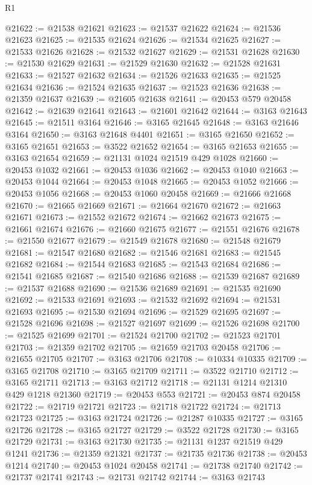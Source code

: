 \begin{lexlean}{R1}
\begin{coremodule}
@21622 := @21538 @21621
@21623 := @21537 @21622
@21624 := @21536 @21623
@21625 := @21535 @21624
@21626 := @21534 @21625
@21627 := @21533 @21626
@21628 := @21532 @21627
@21629 := @21531 @21628
@21630 := @21530 @21629
@21631 := @21529 @21630
@21632 := @21528 @21631
@21633 := @21527 @21632
@21634 := @21526 @21633
@21635 := @21525 @21634
@21636 := @21524 @21635
@21637 := @21523 @21636
@21638 := @21359 @21637
@21639 := @21605 @21638
@21641 := @20453 @579 @20458
@21642 := @21639 @21641
@21643 := @21601 @21642
@21644 := @3163 @21643
@21645 := @21511 @3164
@21646 := @3165 @21645
@21648 := @3163 @21646 @3164
@21650 := @3163 @21648 @4401
@21651 := @3165 @21650
@21652 := @3165 @21651
@21653 := @3522 @21652
@21654 := @3165 @21653
@21655 := @3163 @21654
@21659 := @21131 @1024 @21519 @429 @1028
@21660 := @20453 @1032
@21661 := @20453 @1036
@21662 := @20453 @1040
@21663 := @20453 @1044
@21664 := @20453 @1048
@21665 := @20453 @1052
@21666 := @20453 @1056
@21668 := @20453 @1060 @20458
@21669 := @21666 @21668
@21670 := @21665 @21669
@21671 := @21664 @21670
@21672 := @21663 @21671
@21673 := @21552 @21672
@21674 := @21662 @21673
@21675 := @21661 @21674
@21676 := @21660 @21675
@21677 := @21551 @21676
@21678 := @21550 @21677
@21679 := @21549 @21678
@21680 := @21548 @21679
@21681 := @21547 @21680
@21682 := @21546 @21681
@21683 := @21545 @21682
@21684 := @21544 @21683
@21685 := @21543 @21684
@21686 := @21541 @21685
@21687 := @21540 @21686
@21688 := @21539 @21687
@21689 := @21537 @21688
@21690 := @21536 @21689
@21691 := @21535 @21690
@21692 := @21533 @21691
@21693 := @21532 @21692
@21694 := @21531 @21693
@21695 := @21530 @21694
@21696 := @21529 @21695
@21697 := @21528 @21696
@21698 := @21527 @21697
@21699 := @21526 @21698
@21700 := @21525 @21699
@21701 := @21524 @21700
@21702 := @21523 @21701
@21703 := @21359 @21702
@21705 := @21659 @21703 @20458
@21706 := @21655 @21705
@21707 := @3163 @21706
@21708 := @10334 @10335
@21709 := @3165 @21708
@21710 := @3165 @21709
@21711 := @3522 @21710
@21712 := @3165 @21711
@21713 := @3163 @21712
@21718 := @21131 @1214 @21310 @429 @1218 @21360
@21719 := @20453 @553
@21721 := @20453 @874 @20458
@21722 := @21719 @21721
@21723 := @21718 @21722
@21724 := @21713 @21723
@21725 := @3163 @21724
@21726 := @21287 @10335
@21727 := @3165 @21726
@21728 := @3165 @21727
@21729 := @3522 @21728
@21730 := @3165 @21729
@21731 := @3163 @21730
@21735 := @21131 @1237 @21519 @429 @1241
@21736 := @21359 @21321
@21737 := @21735 @21736
@21738 := @20453 @1214
@21740 := @20453 @1024 @20458
@21741 := @21738 @21740
@21742 := @21737 @21741
@21743 := @21731 @21742
@21744 := @3163 @21743

\end{coremodule}
\end{lexlean}
